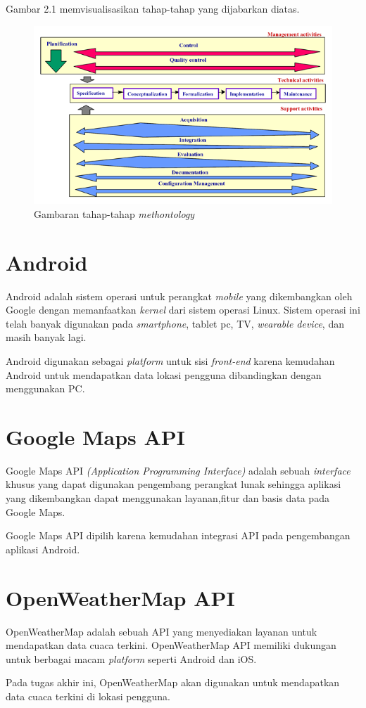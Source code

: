 \par
Gambar 2.1 memvisualisasikan tahap-tahap yang dijabarkan diatas.
\begin{figure}[h!]
    \centering
    \includegraphics[scale=0.5]{img/methontology_cycle.png}
    \caption{Gambaran tahap-tahap \textit{methontology}}
    \label{fig:Gambar}
\end{figure}

\section{Android}
Android adalah sistem operasi untuk perangkat \textit{mobile} yang dikembangkan oleh Google dengan memanfaatkan \textit{kernel} dari sistem operasi Linux. Sistem operasi ini telah banyak digunakan pada \textit{smartphone}, tablet pc, TV, \textit{wearable device}, dan masih banyak lagi.

Android digunakan sebagai \textit{platform} untuk sisi \textit{front-end} karena kemudahan Android untuk mendapatkan data lokasi pengguna dibandingkan dengan menggunakan PC.

\section{Google Maps API}
Google Maps API \textit{(Application Programming Interface)} adalah sebuah \textit{interface} khusus yang dapat digunakan pengembang perangkat lunak sehingga aplikasi yang dikembangkan dapat menggunakan layanan,fitur dan basis data pada Google Maps.
\par
Google Maps API dipilih karena kemudahan integrasi API pada pengembangan aplikasi Android.  

\section{OpenWeatherMap API}
OpenWeatherMap adalah sebuah API yang menyediakan layanan untuk mendapatkan data cuaca terkini. OpenWeatherMap API memiliki dukungan untuk berbagai macam \textit{platform} seperti Android dan iOS.
\par
Pada tugas akhir ini, OpenWeatherMap akan digunakan untuk mendapatkan data cuaca terkini di lokasi pengguna.

